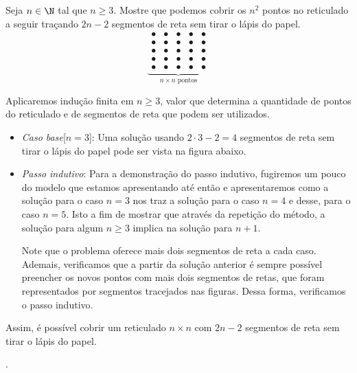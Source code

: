 \begin{example}
Seja $n \in \N$ tal que $n\ge 3$. Mostre  que podemos cobrir os $n^2$ pontos no reticulado a seguir traçando $2n-2$ segmentos de reta sem tirar o lápis do papel.
%
\begin{equation*}
\underbrace{\begin{array}{ccccc}
                \bullet & \bullet & \bullet & \bullet & \bullet \\
                \bullet & \bullet & \bullet & \bullet & \bullet \\
                \bullet & \bullet & \bullet & \bullet & \bullet \\
                \bullet & \bullet & \bullet & \bullet & \bullet \\
                \bullet & \bullet & \bullet & \bullet & \bullet
              \end{array}
}_{n \times n \text{ pontos}}
\end{equation*}
\begin{solution}
	Aplicaremos indução finita em $n \ge 3$, valor que determina a quantidade de pontos do reticulado e de segmentos de reta que podem ser utilizados.
	\begin{itemize}
		\item \textit{Caso base}[$n = 3$]: Uma solução usando $2\cdot 3 -2 = 4$ segmentos de reta sem tirar o lápis do papel pode ser vista na figura abaixo.

		\begin{center}
		\end{center}
		
		\item \textit{Passo indutivo}: Para a demonstração do passo indutivo, fugiremos um pouco do modelo que estamos apresentando até então e apresentaremos como a solução para o caso $n = 3$ nos traz a solução para o caso $n = 4$ e desse, para o caso $n=5$. Isto a fim de mostrar que através da repetição do método, a solução para algum $n \ge 3$ implica na solução para $n+1$.
		
		\begin{center}
		\end{center}
		
		Note que o problema oferece mais dois segmentos de reta a cada caso. Ademais, verificamos que a partir da solução anterior é sempre possível preencher os novos pontos com mais dois segmentos de retas, que foram representados por segmentos tracejados nas figuras. Dessa forma, verificamos o passo indutivo.
	\end{itemize}

Assim, é possível cobrir um reticulado $n \times n$ com $2n-2$ segmentos de reta sem tirar o lápis do papel.
\end{solution}
\end{example}
\begin{tve}
	.
\end{tve}


